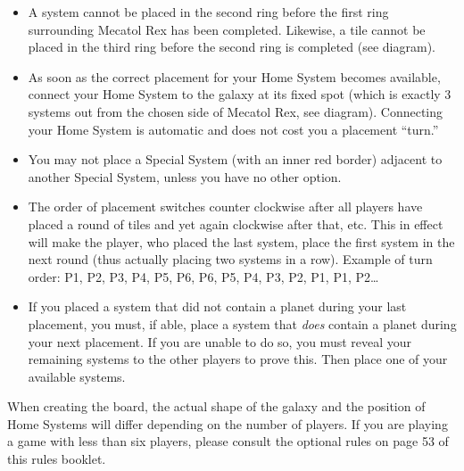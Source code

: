 \documentclass[11pt,fleqn]{book} %
\begin{document}
\begin{itemize}
\item A system cannot be placed in the second ring before the first ring surrounding Mecatol Rex has been completed. Likewise, a tile cannot be placed in the third ring before the second ring is completed (see diagram).
\item As soon as the correct placement for your Home System becomes available, connect your Home System to the galaxy at its fixed spot (which is exactly 3 systems out from the chosen side of Mecatol Rex, see diagram). Connecting your Home System is automatic and does not cost you a placement “turn.”
\item You may not place a Special System (with an inner red border) adjacent to another Special System, unless you have no other option.
\item The order of placement switches counter clockwise after all players have placed a round of tiles and yet again clockwise after that, etc. This in effect will make the player, who placed the last system, place the first system in the next round (thus actually placing two systems in a row). Example of turn order: P1, P2, P3, P4, P5, P6, P6, P5, P4, P3, P2, P1, P1, P2…
\item If you placed a system that did not contain a planet during your last placement, you must, if able, place a system that \emph{does} contain a planet during your next placement. If you are unable to do so, you must reveal your remaining systems to the other players to prove this. Then place one of your available systems.
\end{itemize}

When creating the board, the actual shape of the galaxy and the position of Home Systems will differ depending on the number of players. If you are playing a game with less than six players, please consult the optional rules on page 53 of this rules booklet.
\end{document}
